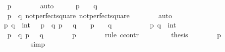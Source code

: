 \begin{isabellebody}
\ {\isacharbackquoteopen}{}\ {\isasymle}\ p{\isacharbackquoteclose}\isanewline
\ \ \ \ \ \ \isamarkupfalse%
\ auto\isanewline
\ \ \ \ \isamarkupfalse%
\ {\isachardoublequoteopen}p\ {\isacharequal}\ {}\ {\isasymor}\ q\ {\isacharequal}\ {}{\isachardoublequoteclose}\isanewline
\ \ \ \ \ \ \isamarkupfalse%
\ {\isacharbackquoteopen}{}\ {\isacharequal}\ p{\isacharcircum}{}\ {\isacharplus}\ q{\isacharcircum}{}{\isacharbackquoteclose}\ not{\isacharunderscore}perfect{\isacharunderscore}square{\isacharunderscore}{}\ not{\isacharunderscore}perfect{\isacharunderscore}square{\isacharunderscore}{}\isanewline
\ \ \ \ \ \ \isamarkupfalse%
\ auto\isanewline
\ \ \isamarkupfalse%
\isanewline
\ \ \isamarkupfalse%
\isanewline
\ \ \isamarkupfalse%
\ {\isachardoublequoteopen}{\isasymAnd}\ p\ q\ {\isacharcolon}{\isacharcolon}\ int{\isachardot}\ {\isasymlbrakk}{}\ {\isacharequal}\ p{\isacharcircum}{}\ {\isacharplus}\ q{\isacharcircum}{}{\isacharsemicolon}\ p\ {\isasymge}\ {}{\isacharsemicolon}\ q\ {\isasymge}\ {}{\isasymrbrakk}\ {\isasymLongrightarrow}\ p\ {\isacharequal}\ {}\ {\isasymor}\ q\ {\isacharequal}\ {}{\isachardoublequoteclose}\isanewline
\ \ \isamarkupfalse%
{\isacharminus}\isanewline
\ \ \ \ \isamarkupfalse%
\ p\ q\ {\isacharcolon}{\isacharcolon}\ int\isanewline
\ \ \ \ \isamarkupfalse%
\ {\isachardoublequoteopen}{}\ {\isacharequal}\ p{\isacharcircum}{}\ {\isacharplus}\ q{\isacharcircum}{}{\isachardoublequoteclose}\ {\isachardoublequoteopen}p\ {\isasymge}\ {}{\isachardoublequoteclose}\ {\isachardoublequoteopen}q\ {\isasymge}\ {}{\isachardoublequoteclose}\isanewline
\ \ \ \ \isamarkupfalse%
\ {\isachardoublequoteopen}p\ {\isasymle}\ {}{\isachardoublequoteclose}\isanewline
\ \ \ \ \isamarkupfalse%
\ {\isacharparenleft}rule\ ccontr{\isacharparenright}\isanewline
\ \ \ \ \ \ \isamarkupfalse%
\ {\isachardoublequoteopen}{\isasymnot}\ {\isacharquery}thesis{\isachardoublequoteclose}\isanewline
\ \ \ \ \ \ \isamarkupfalse%
\ {\isachardoublequoteopen}p\ {\isasymge}\ {}{\isachardoublequoteclose}\isanewline
\ \ \ \ \ \ \ \ \isamarkupfalse%
\ simp\isanewline
\ \ \ \ \ \ \isamarkupfalse%

\end{isabellebody}
